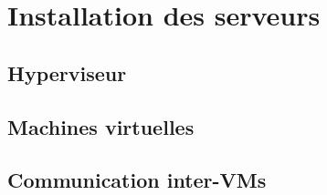 \section{Installation des serveurs}
	\subsection{Hyperviseur}

	\subsection{Machines virtuelles}

	\subsection{Communication inter-VMs}

